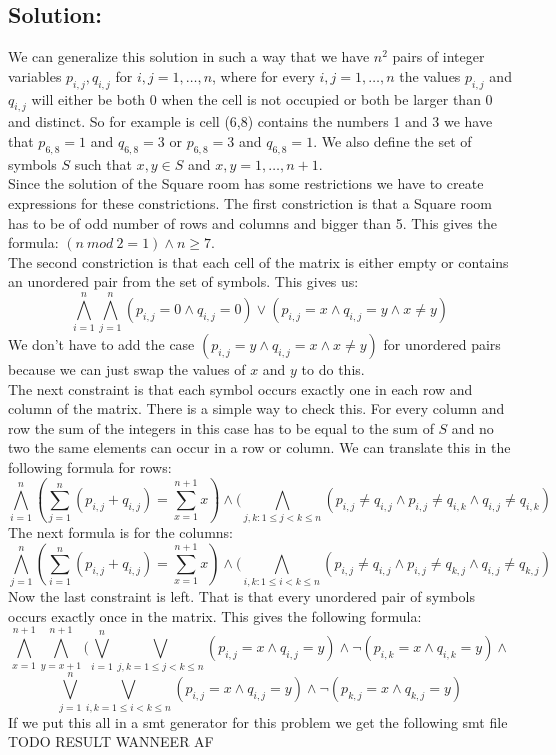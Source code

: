 \documentclass[12pt]{article}
\begin{document}
{\subsection*{Solution:}
We can generalize this solution in such a way that we have $n^2$ pairs of integer variables $p_{i,j}, q_{i,j}$ for $i,j = 1, \ldots, n$, where for every $i,j = 1, \ldots, n$ the values $p_{i,j}$ and $q_{i,j}$ will either be both 0 when the cell is not occupied or both be larger than 0 and distinct. So for example is cell (6,8) contains the numbers 1 and 3 we have that $p_{6,8} = 1$ and  $q_{6,8} = 3$ or  $p_{6,8} = 3$ and  $q_{6,8} = 1$. We also define the set of symbols $S$ such that $x,y \in S$ and $x,y = 1, \ldots, n+1$.\\
Since the solution of the Square room has some restrictions we have to create expressions for these constrictions. The first constriction is that a Square room has to be of odd number of rows and columns and bigger than 5. This gives the formula: $(n \ mod \ 2 = 1) \wedge n \geq 7$.\\
The second constriction is that each cell of the matrix is either empty or contains an unordered pair from the set of symbols. This gives us:
\[\bigwedge_{i=1}^{n} \bigwedge_{j=1}^{n} (p_{i,j} = 0 \wedge q_{i,j} = 0) \vee (p_{i,j} = x \wedge q_{i,j} = y \wedge x \neq y)\]
We don't have to add the case $(p_{i,j} = y \wedge q_{i,j} = x \wedge x \neq y)$ for unordered pairs because we can just swap the values of $x$ and $y$ to do this.\\
The next constraint is that each symbol occurs exactly one in each row and column of the matrix. There is a simple way to check this. For every column and row the sum of the integers in this case has to be equal to the sum of $S$ and no two the same elements can occur in a row or column. We can translate this in the following formula for rows:
\[\bigwedge_{i=1}^{n} (\sum_{j=1}^{n} (p_{i,j} + q_{i,j}) = \sum_{x=1}^{n+1} x) \wedge (\bigwedge_{j,k: 1\leq j < k \leq n} (p_{i,j} \neq q_{i,j} \wedge p_{i,j} \neq q_{i,k} \wedge q_{i,j} \neq q_{i,k})\]
The next formula is for the columns:
\[\bigwedge_{j=1}^{n} (\sum_{i=1}^{n} (p_{i,j} + q_{i,j}) = \sum_{x=1}^{n+1} x) \wedge (\bigwedge_{i,k: 1\leq i < k \leq n} (p_{i,j} \neq q_{i,j} \wedge p_{i,j} \neq q_{k,j} \wedge q_{i,j} \neq q_{k,j})\]
Now the last constraint is left. That is that every unordered pair of symbols occurs exactly once in the matrix. This gives the following formula:
\[\bigwedge_{x=1}^{n+1} \bigwedge_{y=x+1}^{n+1} ( \bigvee_{i=1}^{n} \bigvee_{j,k = 1 \leq j < k \leq n} (p_{i,j} = x \wedge q_{i,j} = y) \wedge \neg (p_{i,k} = x \wedge q_{i,k} = y)  \wedge \]
\[ \bigvee_{j=1}^{n} \bigvee_{i,k = 1 \leq i < k \leq n} (p_{i,j} = x \wedge q_{i,j} = y) \wedge \neg (p_{k,j} = x \wedge q_{k,j} = y) \]
If we put this all in a smt generator for this problem we get the following smt file
TODO RESULT WANNEER AF

}
\end{document}
